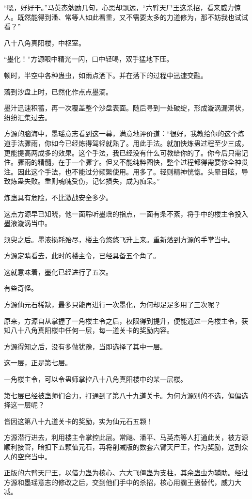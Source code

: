 \begin{this_body}
“嗯，好好干。”马英杰勉励几句，心思却飘远，“六臂天尸王这杀招，看来威力惊人。既然能得到潘、常等人如此看重，又不需要太多的力道修为，那不妨我也试试看？”

八十八角真阳楼，中枢室。

“墨化！”方源眼中精光一闪，口中轻喝，双手猛地下压。

顿时，半空中各种蛊虫，如雨点洒下。并在落下的过程中迅速交融。

落到沙盘上时，已然化作点点墨滴。

墨汁迅速积蓄，再一次覆盖整个沙盘表面。随后寻到一处破绽，形成漩涡漏洞状，纷纷汇集过去。

方源的脑海中，墨瑶意志看到这一幕，满意地评价道：“很好，我教给你的这个炼道手法骤雨，你如今已经炼得驾轻就熟了。用此手法。就加快炼蛊过程至少三成，更能提高两成多的效果。这个手法，我已经没有什么可教给你的了。你今后只需记住。骤雨的精髓，在于一个骤字。但又不能纯粹图快，整个过程都得需要你全神贯注。因此这个手法，也不能过分频繁使用。用多了。轻则精神恍惚。头晕目眩，导致炼蛊失败。重则魂魄受伤，记忆损失，成为痴呆。”

炼蛊具有危险，不比激战安全多少。

这点方源早已知晓，他一面聆听墨瑶的指点，一面有条不紊，将手中的楼主令投入墨液漩涡当中。

须臾之后。墨液损耗殆尽，楼主令悠悠飞升上来。重新落到方源的手掌当中。

方源定睛看去，此时的楼主令，已经具备五个角了。

这就意味着，墨化已经进行了五次。

有些奇怪。

方源仙元石稀缺，最多只能再进行一次墨化，为何却足足多用了三次呢？

原来，方源自从掌握了一角楼主令之后，权限得到提升，便能通过一角楼主令，获知八十八角真阳楼中任何一层，每一道关卡的奖励内容。

方源得知之后，没有多做犹豫，当即选择了其中一层。

这一层，正是第七层。

一角楼主令，可以令蛊师掌控八十八角真阳楼中的某一层楼。

第七层已经被蛊师们合力，打通到了第八十九道关卡。为何方源别的不选，偏偏选择这一层呢？

皆因这第八十九道关卡的奖励，实为仙元石五颗！

方源潜行进去，利用楼主令掌控此层。常飚、潘平、马英杰等人打通此关，被方源顺利接管，暗扣下五颗仙元石，再将削减版的数套六臂天尸王，作为奖励，送到众人的空窍当中。

正版的六臂天尸王，以借力蛊为核心、六大飞僵蛊为支柱，其余蛊虫为辅助。经过方源和墨瑶意志的修改之后，交到他们手中的杀招，核心用霸王蛊替代，威力大减。


\end{this_body}
